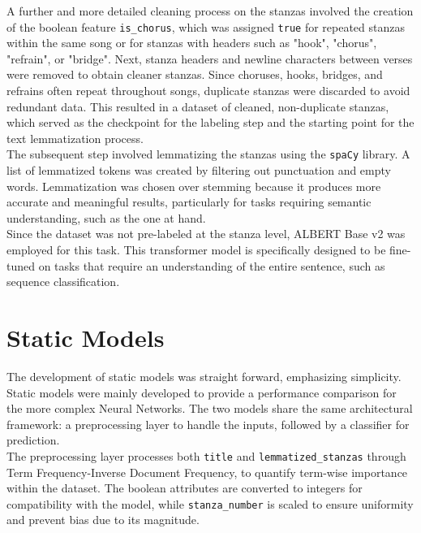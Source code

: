 A further and more detailed cleaning process on the stanzas involved the creation
of the boolean feature \texttt{is\_chorus}, which was assigned \texttt{true}
for repeated stanzas within the same song or for stanzas with headers such
as "hook", "chorus", "refrain", or "bridge".
Next, stanza headers and newline characters between verses were removed to obtain
cleaner stanzas.
Since choruses, hooks, bridges, and refrains often repeat throughout songs,
duplicate stanzas were discarded to avoid redundant data. This resulted in a
dataset of cleaned, non-duplicate stanzas, which served as the checkpoint for
the labeling step and the starting point for the text lemmatization process.\\

The subsequent step involved lemmatizing the stanzas using the
\texttt{spaCy}\textsuperscript{\cite{spacy}}
library. A list of lemmatized tokens was created by filtering out punctuation
and empty words. Lemmatization was chosen over stemming because it produces
more accurate and meaningful results, particularly for tasks requiring semantic
understanding, such as the one at hand.\\

Since the dataset was not pre-labeled at the stanza level, ALBERT Base v2 was employed for this task.
This transformer model is specifically designed to be fine-tuned on tasks that
require an understanding of the entire sentence, such as sequence classification.


\section*{Static Models}
The development of static models was straight forward, emphasizing simplicity.
Static models were mainly developed to provide a performance comparison
for the more complex Neural Networks.
The two models share the same architectural framework: a preprocessing
layer to handle the inputs, followed by a classifier for prediction.\\

The preprocessing layer processes both \texttt{title} and
\texttt{lemmatized\_stanzas} through
Term Frequency-Inverse Document Frequency, %
to quantify term-wise importance
within the dataset. The boolean attributes
are converted to integers for compatibility with the model,
while \texttt{stanza\_number} is scaled
to ensure uniformity and prevent bias due to its magnitude.\\

